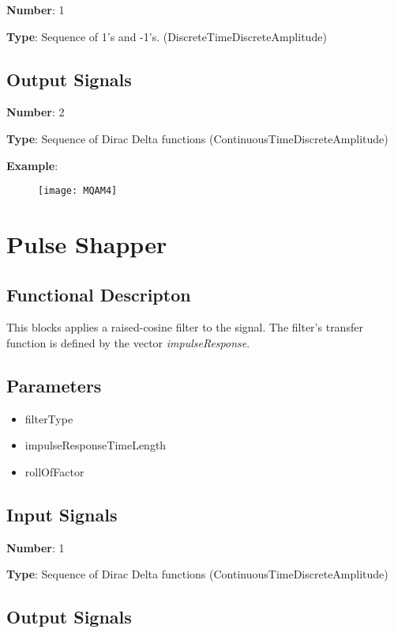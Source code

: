 \documentclass[a4paper]{article}
\begin{document}
\textbf{Number}: 1

\textbf{Type}: Sequence of 1's and -1's. (DiscreteTimeDiscreteAmplitude)

\subsection*{Output Signals}

\textbf{Number}: 2

\textbf{Type}: Sequence of Dirac Delta functions (ContinuousTimeDiscreteAmplitude)

\textbf{Example}:

\begin{figure}
	\texttt{[image: MQAM4]}
\end{figure}

\pagebreak

\section{Pulse Shapper}

\subsection*{Functional Descripton}

This blocks applies a raised-cosine filter to the signal. The filter's transfer function is defined by the vector \textit{impulseResponse}.

\subsection*{Parameters}

\begin{itemize}
	\item filterType
	\item impulseResponseTimeLength
	\item rollOfFactor
\end{itemize}


\subsection*{Input Signals}

\textbf{Number}: 1

\textbf{Type}: Sequence of Dirac Delta functions (ContinuousTimeDiscreteAmplitude)

\subsection*{Output Signals}
\end{document}
